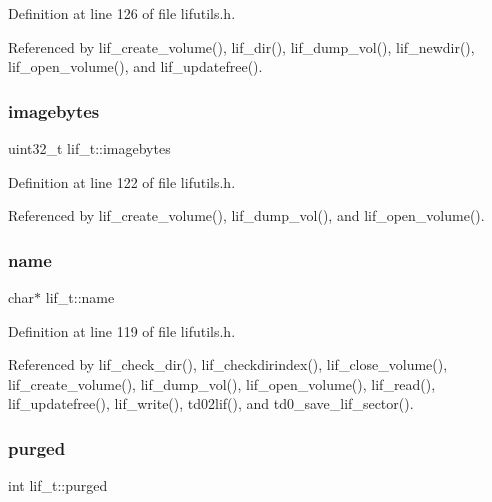 Definition at line 126 of file lifutils.\+h.



Referenced by lif\+\_\+create\+\_\+volume(), lif\+\_\+dir(), lif\+\_\+dump\+\_\+vol(), lif\+\_\+newdir(), lif\+\_\+open\+\_\+volume(), and lif\+\_\+updatefree().

\mbox{\label{structlif__t_afabd64e66adb03eef2249b6c627faac7}} 
\subsubsection{\texorpdfstring{imagebytes}{imagebytes}}
{\footnotesize\ttfamily uint32\+\_\+t lif\+\_\+t\+::imagebytes}



Definition at line 122 of file lifutils.\+h.



Referenced by lif\+\_\+create\+\_\+volume(), lif\+\_\+dump\+\_\+vol(), and lif\+\_\+open\+\_\+volume().

\mbox{\label{structlif__t_ae6b943f3c26005fc375169960e9049f7}} 
\subsubsection{\texorpdfstring{name}{name}}
{\footnotesize\ttfamily char$\ast$ lif\+\_\+t\+::name}



Definition at line 119 of file lifutils.\+h.



Referenced by lif\+\_\+check\+\_\+dir(), lif\+\_\+checkdirindex(), lif\+\_\+close\+\_\+volume(), lif\+\_\+create\+\_\+volume(), lif\+\_\+dump\+\_\+vol(), lif\+\_\+open\+\_\+volume(), lif\+\_\+read(), lif\+\_\+updatefree(), lif\+\_\+write(), td02lif(), and td0\+\_\+save\+\_\+lif\+\_\+sector().

\mbox{\label{structlif__t_a1dfef3ca99d6ba9680bb9b6bf8fafc32}} 
\subsubsection{\texorpdfstring{purged}{purged}}
{\footnotesize\ttfamily int lif\+\_\+t\+::purged}



